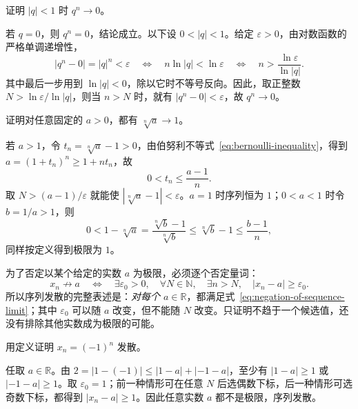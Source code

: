\documentclass[UTF8,12pt,a4paper,fontset=fandol]{ctexbook}
\begin{document}
\begin{example}
\label{ex:geometric-sequence-limit}
证明 $|q|<1$ 时 $q^n\to0$。
\end{example}

\begin{solve}
若 $q=0$，则 $q^n=0$，结论成立。以下设 $0<|q|<1$。给定 $\varepsilon>0$，由对数函数的严格单调递增性，
\[
    |q^n-0|=|q|^n<\varepsilon
    \quad\Longleftrightarrow\quad
    n\ln|q|<\ln\varepsilon
    \quad\Longleftrightarrow\quad
    n>\frac{\ln\varepsilon}{\ln|q|}.
\]
其中最后一步用到 $\ln|q|<0$，除以它时不等号反向。因此，取正整数 $N>\ln\varepsilon/\ln|q|$，则当 $n>N$ 时，就有 $|q^n-0|<\varepsilon$，故 $q^n\to0$。
\end{solve}

\begin{example}
\label{ex:fixed-root-sequence-limit}
证明对任意固定的 $a>0$，都有 $\sqrt[n]{a}\to1$。
\end{example}

\begin{solve}
若 $a>1$，令 $t_n=\sqrt[n]{a}-1>0$，由伯努利不等式~\eqref{eq:bernoulli-inequality}，得到 $a=(1+t_n)^n\geq1+nt_n$，故
\[
    0<t_n\leq\frac{a-1}{n}.
\]
取 $N>(a-1)/\varepsilon$ 就能使 $|\sqrt[n]{a}-1|<\varepsilon$。$a=1$ 时序列恒为 $1$；$0<a<1$ 时令 $b=1/a>1$，则
\[
    0<1-\sqrt[n]{a}
    =\frac{\sqrt[n]{b}-1}{\sqrt[n]{b}}
    \leq\sqrt[n]{b}-1\leq\frac{b-1}{n},
\]
同样按定义得到极限为 $1$。
\end{solve}

为了否定以某个给定的实数 $a$ 为极限，必须逐个否定量词：
\begin{equation}
    x_n\not\to a
    \quad\Longleftrightarrow\quad
    \exists\varepsilon_0>0,\quad\forall N\in\mathbb{N},\quad
    \exists n>N,\quad |x_n-a|\geq\varepsilon_0.
    \label{eq:negation-of-sequence-limit}
\end{equation}
所以序列发散的完整表述是：\emph{对每个 $a\in\mathbb{R}$}，都满足式~\eqref{eq:negation-of-sequence-limit}；其中 $\varepsilon_0$ 可以随 $a$ 改变，但不能随 $N$ 改变。只证明不趋于一个候选值，还没有排除其他实数成为极限的可能。

\begin{example}
\label{ex:alternating-sequence-divergence-by-definition}
用定义证明 $x_n=(-1)^n$ 发散。
\end{example}

\begin{solve}
任取 $a\in\mathbb{R}$。由 $2=|1-(-1)|\leq|1-a|+|-1-a|$，至少有 $|1-a|\geq1$ 或 $|-1-a|\geq1$。取 $\varepsilon_0=1$；前一种情形可在任意 $N$ 后选偶数下标，后一种情形可选奇数下标，都得到 $|x_n-a|\geq1$。因此任意实数 $a$ 都不是极限，序列发散。
\end{solve}
\end{document}
